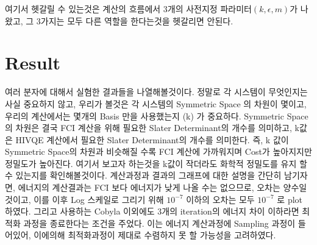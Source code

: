 \documentclass[11pt]{article}
\begin{document}
여기서 헷갈릴 수 있는것은 계산의 흐름에서 3개의 사전지정 파라미터\(\left(k,\epsilon, m \right)\)가 나왔고, 그 3가지는 모두 다른 역할을 한다는것을 헷갈리면 안된다.

\newpage

\section{Result}
여러 분자에 대해서 실혐한 결과들을 나열해볼것이다. 정말로 각 시스템이 무엇인지는 사실 중요하지 않고, 우리가 볼것은 각 시스템의 Symmetric Space 의 차원이 몇이고, 우리의 계산에서는 몇개의 Basis 만을 사용했는지 (k) 가 중요하다. 
Symmetric Space 의 차원은 결국 FCI 계산을 위해 필요한 Slater Determinant의 개수를 의미하고, k값은 HIVQE 계산에서 필요한 Slater Determinant의 개수를 의미한다. 
즉, k 값이 Symmetric Space의 차원과 비슷해질 수록 FCI 계산에 가까워지며 Cost가 높아지지만 정밀도가 높아진다. 
여기서 보고자 하는것을 k값이 작더라도 화학적 정밀도를 유지 할 수 있는지를 확인해볼것이다. 
계산과정과 결과의 그래프에 대한 설명을 간단히 남기자면, 에너지의 계산결과는 FCI 보다 에너지가 낮게 나올 수는 없으므로, 오차는 양수일것이고, 이를 이후 Log 스케일로 그리기 위해 \(10^{-7}\) 이하의 오차는 모두 \(10^{-7}\) 로 plot 하였다.
그리고 사용하는 Cobyla 이외에도 3개의 iteration의 에너지 차이 이하라면 최적화 과정을 종료한다는 조건을 주었다. 이는 에너지 계산과정에 Sampling 과정이 들어있어, 이에의해 최적화과정이 제대로 수렴하지 못 할 가능성을 고려하였다. 
\end{document}
